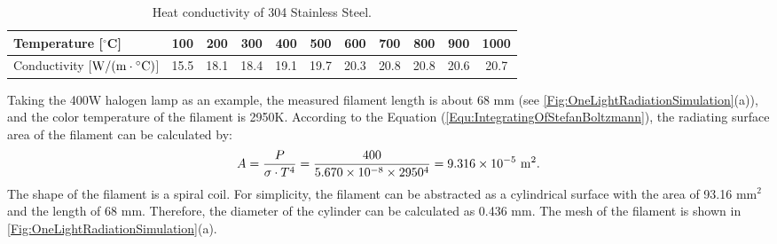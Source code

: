 
\begin{table}[htbp]
  \centering
  \caption{Heat conductivity of 304 Stainless Steel.}
    \begin{tabular}{lcccccccccc}
    \toprule
    Temperature [$^{\circ}$C] & 100   & 200   & 300   & 400   & 500   & 600   & 700   & 800   & 900   & 1000 \\
    \midrule
    Conductivity [${\rm{W/}}({\rm{m}} \cdot {}^ \circ {\rm{C}})$] & 15.5  & 18.1  & 18.4  & 19.1  & 19.7  & 20.3  & 20.8  & 20.8  & 20.6  & 20.7 \\
    \bottomrule
    \end{tabular}%
  \label{Tab:SS304HeatTransfer}%
\end{table}%





Taking the 400W halogen lamp as an example, the measured filament length is about 68 mm (see \ref{Fig:OneLightRadiationSimulation}(a)), and the color temperature of the filament is 2950K. According to the Equation (\ref{Equ:IntegratingOfStefanBoltzmann}), the radiating surface area of the filament can be calculated by:
\begin{equation}
A = \frac{P}{\sigma \cdot T^4} = \frac{400}{5.670\times10^{-8}\times2950^4}=9.316\times10^{-5} \rm{\ } {\rm{m }}^2.
\end{equation}
The shape of the filament is a spiral coil. 
For simplicity, the filament can be abstracted as a cylindrical surface with the area of 93.16 mm$^2$ and the length of 68 mm. Therefore, the diameter of the cylinder can be calculated as 0.436 mm. The mesh of the filament is shown in \ref{Fig:OneLightRadiationSimulation}(a).



